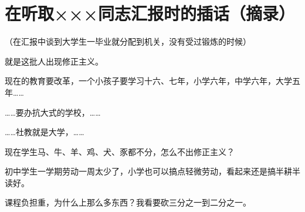 \section[在听取×××同志汇报时的插话（摘录）（一九六五年十一月）]{在听取×××同志汇报时的插话（摘录）}


（在汇报中谈到大学生一毕业就分配到机关，没有受过锻炼的时候）

就是这批人出现修正主义。

现在的教育要改革，一个小孩子要学习十六、七年，小学六年，中学六年，大学五年……

……要办抗大式的学校，……

……社教就是大学，……

现在学生马、牛、羊、鸡、犬、豕都不分，怎么不出修正主义？

初中学生一学期劳动一周太少了，小学也可以搞点轻微劳动，看起来还是搞半耕半读好。

课程负担重，为什么上那么多东西？我看要砍三分之一到二分之一。

